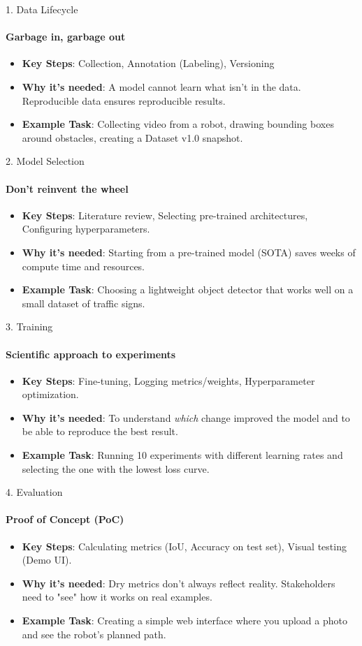 \documentclass[aspectratio=169]{beamer}
\begin{document}
\begin{frame}[t]{1. Data Lifecycle}
    \framesubtitle{Garbage in, garbage out} 
    \begin{itemize}
        \item \textbf{Key Steps}: Collection, Annotation (Labeling), Versioning
        \item \textbf{Why it's needed}: A model cannot learn what isn't in the data. Reproducible data ensures reproducible results.
        \item \textbf{Example Task}: Collecting video from a robot, drawing bounding boxes around obstacles, creating a Dataset v1.0 snapshot.
    \end{itemize}
\end{frame}

\begin{frame}[t]{2. Model Selection}
    \framesubtitle{Don't reinvent the wheel}
    \begin{itemize}
        \item \textbf{Key Steps}: Literature review, Selecting pre-trained architectures, Configuring hyperparameters.
        \item \textbf{Why it's needed}: Starting from a pre-trained model (SOTA) saves weeks of compute time and resources.
        \item \textbf{Example Task}: Choosing a lightweight object detector that works well on a small dataset of traffic signs.
    \end{itemize}
\end{frame}

\begin{frame}[t]{3. Training}
    \framesubtitle{Scientific approach to experiments}
    \begin{itemize}
        \item \textbf{Key Steps}: Fine-tuning, Logging metrics/weights, Hyperparameter optimization.
        \item \textbf{Why it's needed}: To understand \textit{which} change improved the model and to be able to reproduce the best result.
        \item \textbf{Example Task}: Running 10 experiments with different learning rates and selecting the one with the lowest loss curve.
    \end{itemize}
\end{frame}

\begin{frame}[t]{4. Evaluation}
    \framesubtitle{Proof of Concept (PoC)}
    \begin{itemize}
        \item \textbf{Key Steps}: Calculating metrics (IoU, Accuracy on test set), Visual testing (Demo UI).
        \item \textbf{Why it's needed}: Dry metrics don't always reflect reality. Stakeholders need to "see" how it works on real examples.
        \item \textbf{Example Task}: Creating a simple web interface where you upload a photo and see the robot's planned path.
    \end{itemize}
\end{frame}
\end{document}
